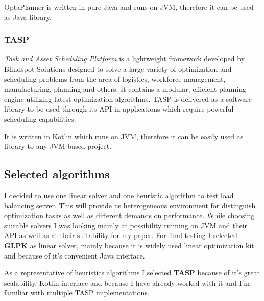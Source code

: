 OptaPlanner is written in pure Java and runs on JVM, therefore it can be used as Java library.

\subsubsection{TASP}
\textit{Task and Asset Scheduling Platform} is a lightweight framework developed by Blindspot Solutions designed to solve a large
variety of optimization and scheduling problems from the area of logistics, workforce management, manufacturing, planning and others.
It contains a modular, efficient planning engine utilizing latest optimization algorithms.
TASP is delivered as a software library to be used through its API in applications which require powerful scheduling capabilities.

It is written in Kotlin which runs on JVM, therefore it can be easily used as library to any JVM based project\@.

\subsection{Selected algorithms}\label{subsec:selected-algorithms}
I decided to use one linear solver and one heuristic algorithm to test load balancing server.
This will provide us heterogeneous environment for distinguish optimization tasks as well as different demands on performance.
While choosing suitable solvers I was looking mainly at possibility running on JVM and their API as well as at their suitability for my paper.
For final testing I selected \textbf{GLPK} as linear solver, mainly because it is widely used linear optimization kit
and because of it's convenient Java interface.

As a representative of heuristics algorithms I selected \textbf{TASP} because of it's great scalability, Kotlin interface
and because I have already worked with it and I'm familiar with multiple TASP implementations.
